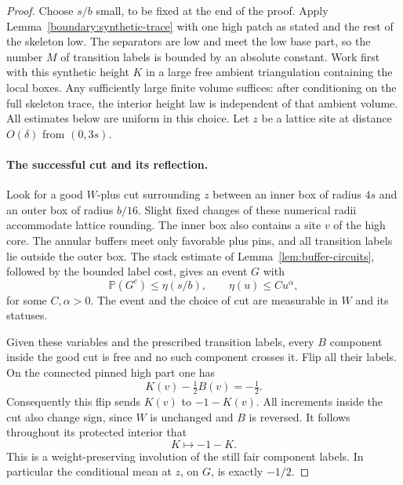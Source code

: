\documentclass[11pt]{article}
\theoremstyle{definition}
\theoremstyle{remark}
\numberwithin{equation}{section}
\begin{document}
\begin{proof}
Choose $s/b$ small, to be fixed at the end of the proof.  Apply
Lemma~\ref{boundary:synthetic-trace} with one high patch as stated and
the rest of the skeleton low.  The separators are low and meet the
low base part, so the number $M$ of transition labels is bounded by
an absolute constant.  Work first with this synthetic height $K$ in
a large free ambient triangulation containing the local boxes.  Any
sufficiently large finite volume suffices: after conditioning on the
full skeleton trace, the interior height law is independent of that
ambient volume.  All estimates below are uniform in this choice.
Let $z$ be a lattice site at distance $O(\delta)$ from $(0,3s)$.

\paragraph{The successful cut and its reflection.}
Look for a good $W$-plus cut surrounding $z$ between an inner box of
radius $4s$ and an outer box of radius $b/16$.  Slight fixed changes
of these numerical radii accommodate lattice rounding.  The inner
box also contains a site $v$ of the high core.  The annular buffers
meet only favorable plus pins, and all transition labels lie outside
the outer box.  The stack estimate of
Lemma~\ref{lem:buffer-circuits}, followed by the bounded label cost,
gives an event $G$ with
\begin{equation}
 \mathbb P(G^c)\le \eta(s/b),\qquad
 \eta(u)\le C u^{\alpha},
 \label{boundary:cut-failure}
\end{equation}
for some $C,\alpha>0$.  The event and the choice of cut are measurable
in $W$ and its statuses.

Given these variables and the prescribed transition labels, every
$B$ component inside the good cut is free and no such component
crosses it.  Flip all their labels.  On the connected pinned high
part one has
\[
 K(v)-\tfrac12B(v)=-\tfrac12.
\]
Consequently this flip sends $K(v)$ to $-1-K(v)$.  All increments
inside the cut also change sign, since $W$ is unchanged and $B$ is
reversed.  It follows throughout its protected interior that
\begin{equation}
 K\longmapsto-1-K.
 \label{boundary:minus-half-reflection}
\end{equation}
This is a weight-preserving involution of the still fair component
labels.  In particular the conditional mean at $z$, on $G$, is
exactly $-1/2$.


\end{proof}
\end{document}
